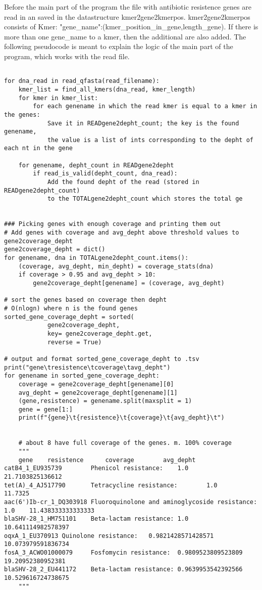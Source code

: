



Before the main part of the program the file with antibiotic resistence genes are read in an saved in the datastructure kmer2gene2kmerpos.
kmer2gene2kmerpos consists of {Kmer: {"gene_name":(kmer_position_in_gene,length_gene)}}.
If there is more than one gene_name to a kmer, then the additional are also added.
The following pseudocode is meant to explain the logic of the main part of the program, which works with
the read file.

\begin{verbatim}

for dna_read in read_qfasta(read_filename):
    kmer_list = find_all_kmers(dna_read, kmer_length)
    for kmer in kmer_list:
        for each genename in which the read kmer is equal to a kmer in the genes:
            Save it in READgene2depht_count; the key is the found genename,
            the value is a list of ints corresponding to the depht of each nt in the gene

    for genename, depht_count in READgene2depht
        if read_is_valid(depht_count, dna_read):
            Add the found depht of the read (stored in READgene2depht_count)
            to the TOTALgene2depht_count which stores the total ge


### Picking genes with enough coverage and printing them out
# Add genes with coverage and avg_depht above threshold values to gene2coverage_depht
gene2coverage_depht = dict()
for genename, dna in TOTALgene2depht_count.items():
    (coverage, avg_depht, min_depht) = coverage_stats(dna)
    if coverage > 0.95 and avg_depht > 10:
        gene2coverage_depht[genename] = (coverage, avg_depht)

# sort the genes based on coverage then depht
# O(nlogn) where n is the found genes
sorted_gene_coverage_depht = sorted(
            gene2coverage_depht, 
            key= gene2coverage_depht.get, 
            reverse = True)

# output and format sorted_gene_coverage_depht to .tsv
print("gene\tresistence\tcoverage\tavg_depht")
for genename in sorted_gene_coverage_depht:
    coverage = gene2coverage_depht[genename][0]
    avg_depht = gene2coverage_depht[genename][1]
    (gene,resistence) = genename.split(maxsplit = 1)
    gene = gene[1:]
    print(f"{gene}\t{resistence}\t{coverage}\t{avg_depht}\t")


    # about 8 have full coverage of the genes. m. 100% coverage
    """
    gene    resistence      coverage        avg_depht
catB4_1_EU935739        Phenicol resistance:    1.0     21.7103825136612
tet(A)_4_AJ517790       Tetracycline resistance:        1.0     11.7325
aac(6')Ib-cr_1_DQ303918 Fluoroquinolone and aminoglycoside resistance:  1.0    11.438333333333333
blaSHV-28_1_HM751101    Beta-lactam resistance: 1.0     10.641114982578397
oqxA_1_EU370913 Quinolone resistance:   0.9821428571428571      10.073979591836734
fosA_3_ACWO01000079     Fosfomycin resistance:  0.9809523809523809      19.20952380952381
blaSHV-28_2_EU441172    Beta-lactam resistance: 0.9639953542392566      10.529616724738675
    """



 
\end{verbatim}